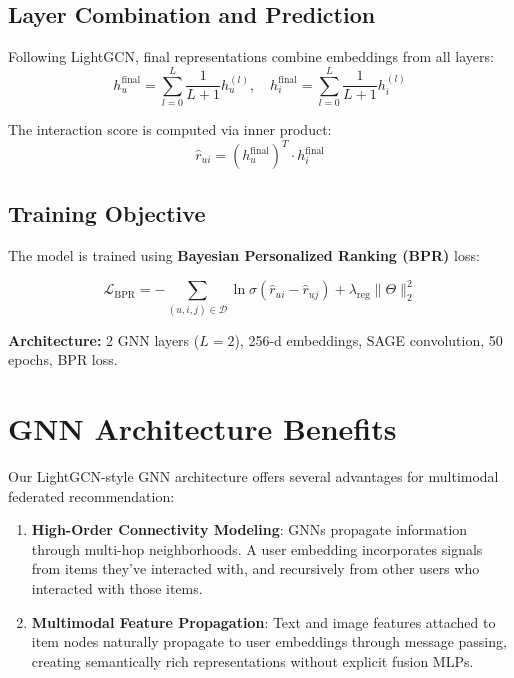 \documentclass[12pt,a4paper]{report}
\begin{document}
{\subsection{Layer Combination and Prediction}
Following LightGCN, final representations combine embeddings from all layers:
\begin{equation}
h_u^{\text{final}} = \sum_{l=0}^{L} \frac{1}{L+1} h_u^{(l)}, \quad h_i^{\text{final}} = \sum_{l=0}^{L} \frac{1}{L+1} h_i^{(l)}
\end{equation}

The interaction score is computed via inner product:
\begin{equation}
\hat{r}_{ui} = (h_u^{\text{final}})^T \cdot h_i^{\text{final}}
\end{equation}

\subsection{Training Objective}
The model is trained using \textbf{Bayesian Personalized Ranking (BPR)} loss:

\begin{equation}
\mathcal{L}_{\text{BPR}} = -\sum_{(u,i,j) \in \mathcal{D}} \ln \sigma(\hat{r}_{ui} - \hat{r}_{uj}) + \lambda_{\text{reg}} \|\Theta\|^2_2
\end{equation}

\textbf{Architecture:} 2 GNN layers ($L=2$), 256-d embeddings, SAGE convolution, 50 epochs, BPR loss.

\section{GNN Architecture Benefits}
Our LightGCN-style GNN architecture offers several advantages for multimodal federated recommendation:

\begin{enumerate}
    \item \textbf{High-Order Connectivity Modeling}: GNNs propagate information through multi-hop neighborhoods. A user embedding incorporates signals from items they've interacted with, and recursively from other users who interacted with those items.
    
    \item \textbf{Multimodal Feature Propagation}: Text and image features attached to item nodes naturally propagate to user embeddings through message passing, creating semantically rich representations without explicit fusion MLPs.
    

\end{enumerate}}
\end{document}
